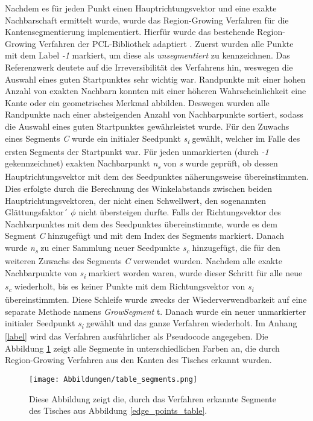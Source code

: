 Nachdem es für jeden Punkt einen Hauptrichtungsvektor und eine exakte Nachbarschaft ermittelt wurde, wurde das Region-Growing Verfahren für die Kantensegmentierung implementiert. Hierfür wurde das bestehende Region-Growing Verfahren der PCL-Bibliothek adaptiert \autocite{rusu_3d_2011}. Zuerst wurden alle Punkte mit dem Label \textit{-1} markiert, um diese als \textit{unsegmentiert} zu kennzeichnen. Das Referenzwerk deutete auf die Irreversibilität des Verfahrens hin, weswegen die Auswahl eines guten Startpunktes sehr wichtig war. Randpunkte mit einer hohen Anzahl von exakten Nachbarn konnten mit einer höheren Wahrscheinlichkeit eine Kante oder ein geometrisches Merkmal abbilden. Deswegen wurden alle Randpunkte nach einer absteigenden Anzahl von Nachbarpunkte sortiert, sodass die Auswahl eines guten Startpunktes gewährleistet wurde. Für den Zuwachs eines Segments \textit{C} wurde ein initialer Seedpunkt \textit{s\textsubscript{i}} gewählt, welcher im Falle des ersten Segments der Startpunkt war. Für jeden unmarkierten (durch \textit{-1} gekennzeichnet) exakten Nachbarpunkt \textit{n\textsubscript{s}} von \textit{s} wurde geprüft, ob dessen Hauptrichtungsvektor mit dem des Seedpunktes näherungsweise übereinstimmten. Dies erfolgte durch die Berechnung des Winkelabstands zwischen beiden Hauptrichtungsvektoren, der nicht einen Schwellwert, den sogenannten Glättungsfaktor´ $\phi$ nicht übersteigen durfte. Falls der Richtungsvektor des Nachbarpunktes mit dem des Seedpunktes übereinstimmte, wurde es dem Segment \textit{C} hinzugefügt und mit dem Index des Segments markiert. Danach wurde \textit{n\textsubscript{s}} zu einer Sammlung neuer Seedpunkte \textit{s\textsubscript{c}} hinzugefügt, die für den weiteren Zuwachs des Segments \textit{C} verwendet wurden. Nachdem alle exakte Nachbarpunkte von \textit{s\textsubscript{i}} markiert worden waren, wurde dieser Schritt für alle neue \textit{s\textsubscript{c}} wiederholt, bis es keiner Punkte mit dem Richtungsvektor von \textit{s\textsubscript{i}} übereinstimmten. Diese Schleife wurde zwecks der Wiederverwendbarkeit auf eine separate Methode namens \textit{GrowSegment} t. Danach wurde ein neuer unmarkierter initialer Seedpunkt \textit{s\textsubscript{i}} gewählt und das ganze Verfahren wiederholt. Im Anhang \ref{label} wird das Verfahren ausführlicher als Pseudocode angegeben. Die Abbildung \ref{segments_table} zeigt alle Segmente in unterschiedlichen Farben an, die durch Region-Growing Verfahren aus den Kanten des Tisches erkannt wurden.

\begin{figure}[h]
	\texttt{[image: Abbildungen/table\_segments.png]}
	\centering
	\caption{Diese Abbildung zeigt die, durch das Verfahren erkannte  Segmente des Tisches aus Abbildung \ref{edge_points_table}.}
	\label{segments_table}
\end{figure}

